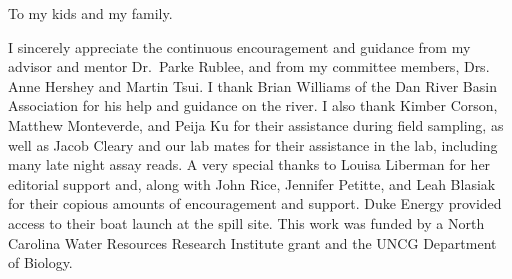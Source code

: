 \documentclass[ms, hidelinks]{uncgdissertationexp}
\theoremstyle{plain}
\theoremstyle{definition}
\theoremstyle{remark}
\begin{document}
\begin{dedication}
  To my kids and my family.
\end{dedication}
\makeapprovalpage

\begin{acknowledgments}
\setlength{\parindent}{0.5in}
  I sincerely appreciate the continuous encouragement and guidance from my advisor and mentor Dr.~Parke Rublee, and from my committee members, Drs. Anne Hershey and Martin Tsui. I thank Brian Williams of the Dan River Basin Association for his help and guidance on the river. I also thank Kimber Corson, Matthew Monteverde, and Peija Ku for their assistance during field sampling, as well as Jacob Cleary and our lab mates for their assistance in the lab, including many late night assay reads. A very special thanks to Louisa Liberman for her editorial support and, along with John Rice, Jennifer Petitte, and Leah Blasiak for their copious amounts of encouragement and support. Duke Energy provided access to their boat launch at the spill site. This work was funded by a North Carolina Water Resources Research Institute grant and the UNCG Department of Biology.
\end{acknowledgments}
\end{document}
